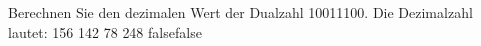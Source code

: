     {Berechnen Sie den dezimalen Wert der Dualzahl 10011100. Die Dezimalzahl lautet:}
    {156}
    {142}
    {78}
    {248}
    {false}{false}
